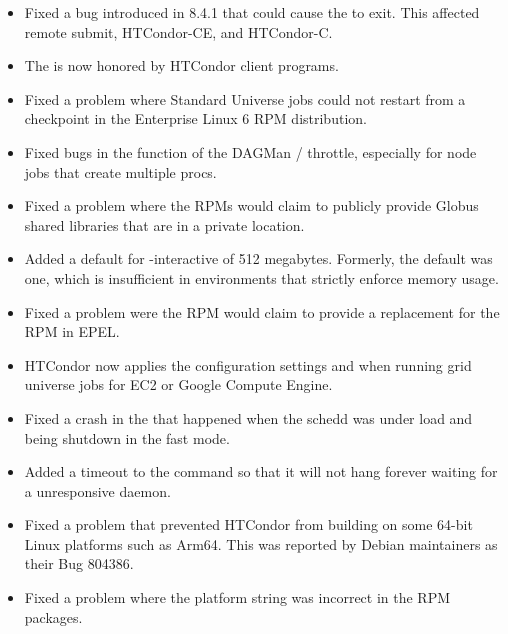\begin{itemize}

\item Fixed a bug introduced in 8.4.1 that could cause the 
to exit.
This affected remote submit, HTCondor-CE, and HTCondor-C.

\item The  is now honored by
HTCondor client programs.

\item Fixed a problem where Standard Universe jobs could not restart
from a checkpoint in the Enterprise Linux 6 RPM distribution.

\item Fixed bugs in the function of the DAGMan
/ throttle,
especially for node jobs that create multiple procs.

\item Fixed a problem where the RPMs would claim to publicly provide
Globus shared libraries that are in a private location.

\item Added a default  for  -interactive
of 512 megabytes.  Formerly, the default was one, which is
insufficient in environments that strictly enforce memory
usage.

\item Fixed a problem were the  RPM would claim to
provide a replacement for the  RPM in EPEL.

\item HTCondor now applies the configuration settings
 and
when running grid universe jobs for EC2 or Google Compute Engine.

\item Fixed a crash in the  that happened when the
schedd was under load and being shutdown in the fast mode.

\item Added a timeout to the  command so that it
will not hang forever waiting for a unresponsive daemon.

\item Fixed a problem that prevented HTCondor from building on some 64-bit Linux
platforms such as Arm64.
This was reported by Debian maintainers as their Bug 804386.

\item Fixed a problem where the platform string was incorrect in the RPM
packages.

\end{itemize}

